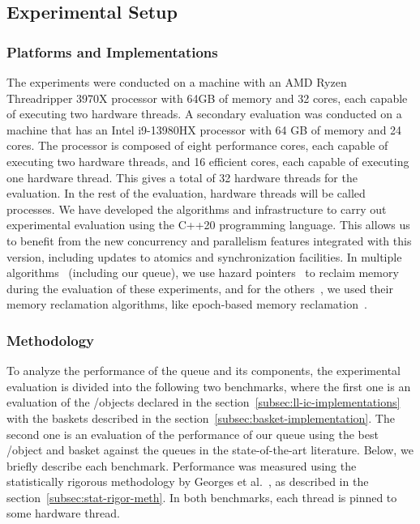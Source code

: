 \subsection{\label{subsec:queue-experimental-setup}Experimental Setup}
\subsubsection{Platforms and Implementations}

The experiments were conducted on a machine with an AMD Ryzen Threadripper 3970X processor with 64GB of memory and 32 cores, each capable of executing two hardware threads. A secondary evaluation was conducted on a machine that has an Intel i9-13980HX processor with 64 GB of memory and 24 cores. The processor is composed of eight performance cores, each capable of executing two hardware threads, and 16 efficient cores, each capable of executing one hardware thread. This gives a total of 32 hardware threads for the evaluation. In the rest of the evaluation, hardware threads will be called processes. We have developed the algorithms and infrastructure to carry out experimental evaluation using the C++20 programming language. This allows us to benefit from the new concurrency and parallelism features integrated with this version, including updates to atomics and synchronization facilities. In multiple algorithms~\cite{ DBLP_conf_podc_MichaelS96,ppopp2013x86queues, Ramalhete_Correia_MPMC_2016} (including our queue), we use hazard pointers~\cite{DBLP_conf_podc_Michael02} to reclaim memory during the evaluation of these experiments, and for the others~\cite{scalingconcurrent2020, DBLP_conf_ppopp_YangM16}, we used their memory reclamation algorithms, like epoch-based memory reclamation~\cite{DBLP_phd_ethos_Fraser04,mckenney2001read}.

\subsubsection{\label{subsubsec:queues-experiment-methodology}Methodology}

To analyze the performance of the queue and its components, the experimental evaluation is divided into the following two benchmarks, where the first one is an evaluation of the \LL/\IC objects declared in the section~\ref{subsec:ll-ic-implementations} with the baskets described in the section~\ref{subsec:basket-implementation}. The second one is an evaluation of the performance of our queue using the best \LL/\IC object and basket against the queues in the state-of-the-art literature. Below, we briefly describe each benchmark. Performance was measured using the statistically rigorous methodology by Georges et al.~\cite{DBLP_conf_oopsla_GeorgesBE07}, as described in the section~\ref{subsec:stat-rigor-meth}. In both benchmarks, each thread is pinned to some hardware thread.

